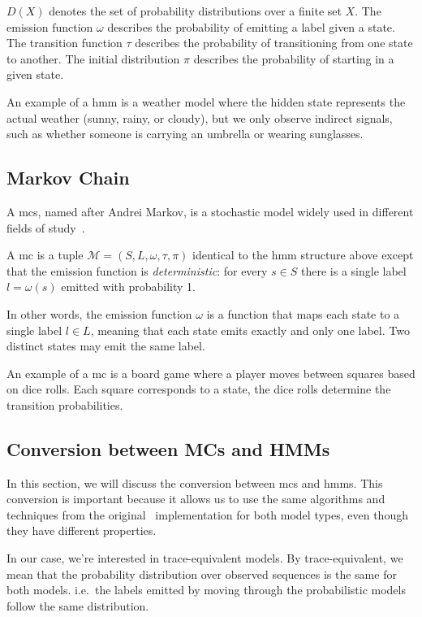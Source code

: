 $D(X)$ denotes the set of probability distributions over a finite set $X$.
The emission function $\omega$ describes the probability of emitting a label given a state.
The transition function $\tau$ describes the probability of transitioning from one state to another.
The initial distribution $\pi$ describes the probability of starting in a given state.

An example of a \gls{hmm} is a weather model where the hidden state represents the actual weather (sunny, rainy, or cloudy), but we only observe indirect signals, such as whether someone is carrying an umbrella or wearing sunglasses.

\subsection{Markov Chain}\label{subsec:mc}
A \glspl{mc}, named after Andrei Markov, is a stochastic model widely used in different fields of study~\cite{Rabiner89}.


\begin{definition}
    A \gls{mc} is a tuple $\mathcal{M} = (S, L, \omega, \tau, \pi)$ identical to the \gls{hmm} structure above except that the emission function is \emph{deterministic}: for every $s\in S$ there is a single label
    $l=\omega(s)$ emitted with probability 1.
\end{definition}


In other words, the emission function $\omega$ is a function that maps each state to a single label $l \in L$, meaning that each state emits exactly and only one label.
Two distinct states may emit the same label.

An example of a \gls{mc} is a board game where a player moves between squares based on dice rolls.
Each square corresponds to a state, the dice rolls determine the transition probabilities.

\subsection{Conversion between MCs and HMMs}\label{subsec:mc_hmm_conversion}
In this section, we will discuss the conversion between \glspl{mc} and \glspl{hmm}.
This conversion is important because it allows us to use the same algorithms and techniques from the original \Cupaal\ implementation for both model types, even though they have different properties.

In our case, we're interested in trace-equivalent models.
By trace-equivalent, we mean that the probability distribution over observed sequences is the same for both models.
i.e.\ the labels emitted by moving through the probabilistic models follow the same distribution.

